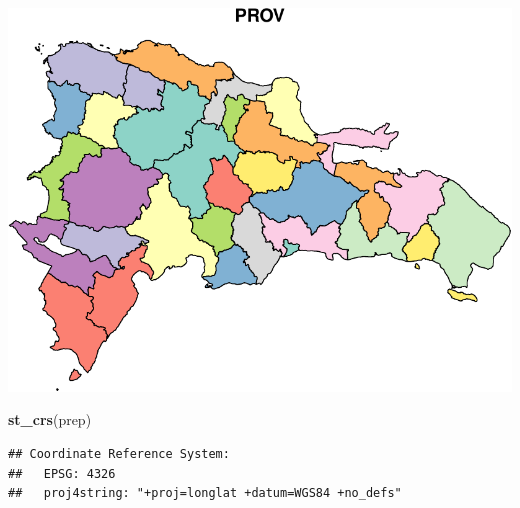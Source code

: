 \documentclass[11pt,]{article}
\newenvironment{Shaded}{\begin{snugshade}}{\end{snugshade}}
\newcommand{\KeywordTok}[1]{\textcolor[rgb]{0.13,0.29,0.53}{\textbf{#1}}}
\newcommand{\DataTypeTok}[1]{\textcolor[rgb]{0.13,0.29,0.53}{#1}}
\newcommand{\DecValTok}[1]{\textcolor[rgb]{0.00,0.00,0.81}{#1}}
\newcommand{\StringTok}[1]{\textcolor[rgb]{0.31,0.60,0.02}{#1}}
\newcommand{\OperatorTok}[1]{\textcolor[rgb]{0.81,0.36,0.00}{\textbf{#1}}}
\newcommand{\NormalTok}[1]{#1}
\begin{document}
\includegraphics{proyecto_files/figure-latex/unnamed-chunk-4-1.pdf}

\begin{Shaded}
\begin{Highlighting}[]
\KeywordTok{st_crs}\NormalTok{(prep)}
\end{Highlighting}
\end{Shaded}

\begin{verbatim}
## Coordinate Reference System:
##   EPSG: 4326 
##   proj4string: "+proj=longlat +datum=WGS84 +no_defs"
\end{verbatim}

\begin{Shaded}
\end{Shaded}
\end{document}
